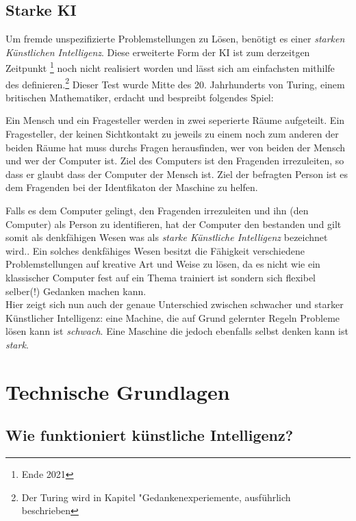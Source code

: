 \documentclass[a4paper,12pt,german,ngerman]{report}
\begin{document}
    \section{Starke KI}
    Um fremde unspezifizierte Problemstellungen zu Lösen, benötigt es einer \emph{starken Künstlichen Intelligenz}.
    Diese erweiterte Form der KI ist zum derzeitgen Zeitpunkt \footnote{Ende 2021} noch nicht realisiert worden und lässt sich am
    einfachsten mithilfe des  definieren.\footnote{Der Turing wird in Kapitel "Gedankenexperiemente, ausführlich beschrieben}
    Dieser Test wurde Mitte des 20. Jahrhunderts von Turing, einem britischen Mathematiker, erdacht und bespreibt folgendes Spiel:
    \begin{displayquote}
        Ein Mensch und ein Fragesteller werden in zwei seperierte
        Räume aufgeteilt. Ein Fragesteller, der keinen Sichtkontakt zu jeweils zu einem noch zum anderen der beiden Räume hat
        muss durchs Fragen herausfinden, wer von beiden der Mensch und wer der Computer ist.
        Ziel des Computers ist den Fragenden irrezuleiten, so dass er glaubt dass der Computer der Mensch ist.
        Ziel der befragten Person ist es dem Fragenden bei der Identfikaton der Maschine zu helfen.\autocite{turing1950computing}
    \end{displayquote}
    Falls es dem Computer gelingt, den Fragenden irrezuleiten und ihn (den Computer) als Person zu identifieren, hat der Computer
    den  bestanden und gilt somit als denkfähigen Wesen was als \emph{starke Künstliche Intelligenz}
    bezeichnet wird.\autocite{oppy&dowe2020turingtest}. Ein solches denkfähiges Wesen besitzt die Fähigkeit verschiedene Problemstellungen
    auf kreative Art und Weise zu lösen, da es nicht wie ein klassischer Computer fest auf ein Thema trainiert ist sondern
    sich flexibel selber(!) Gedanken machen kann.\\

    Hier zeigt sich nun auch der genaue Unterschied zwischen schwacher und starker Künstlicher Intelligenz: eine Machine,
    die auf Grund gelernter Regeln Probleme lösen kann ist \emph{schwach}. Eine Maschine die jedoch ebenfalls selbst denken
    kann ist \emph{stark}.

    \chapter{Technische Grundlagen}
    \section{Wie funktioniert künstliche Intelligenz?}
\end{document}

